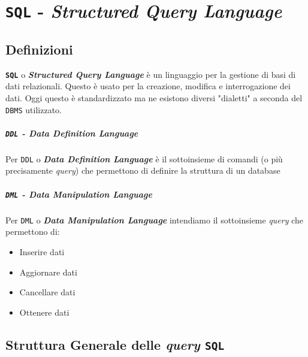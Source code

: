 \chapter{\texttt{SQL} - \textit{Structured Query Language}}
\thispagestyle{chapterInit}
\section{Definizioni}
    \texttt{\textbf{SQL}} o \textbf{\textit{Structured Query Language}} è un linguaggio per la gestione di basi di dati relazionali. Questo è usato per la creazione, modifica e interrogazione dei dati. Oggi questo è standardizzato ma ne esistono diversi "dialetti" a seconda del \texttt{DBMS} utilizzato.
    \paragraph{\texttt{DDL} - \textit{Data Definition Language}} 
        Per \texttt{DDL} o \textbf{\textit{Data Definition Language}} è il sottoinsieme di comandi (o più precisamente \textit{query}) che permettono di definire la struttura di un database
    \paragraph{\texttt{DML} - \textit{Data Manipulation Language}}
        Per \texttt{DML} o \textbf{\textit{Data Manipulation Language}} intendiamo il sottoinsieme \textit{query} che permettono di:\begin{itemize}
            \item Inserire dati
            \item Aggiornare dati
            \item Cancellare dati
            \item Ottenere dati
        \end{itemize}
\section{Struttura Generale delle \textit{query} \texttt{SQL}}
